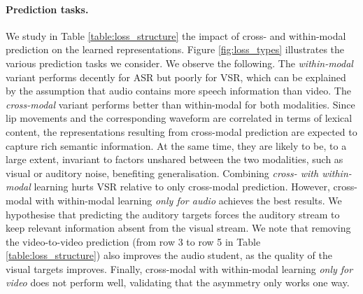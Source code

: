 \documentclass{article} \usepackage{iclr2023_conference,times}
\begin{document}
\paragraph{Prediction tasks.} We study in Table \ref{table:loss_structure} the impact of cross- and within-modal prediction on the learned representations. Figure \ref{fig:loss_types} illustrates the various prediction tasks we consider. We observe the following. The \textit{within-modal} variant performs decently for ASR but poorly for VSR, which can be explained by the assumption that audio contains more speech information than video. The \textit{cross-modal} variant performs better than within-modal for both modalities. Since lip movements and the corresponding waveform are correlated in terms of lexical content, the representations resulting from cross-modal prediction are expected to capture rich semantic information. At the same time, they are likely to be, to a large extent, invariant to factors unshared between the two modalities, such as visual or auditory noise, benefiting generalisation. Combining \textit{cross- with within-modal} learning hurts VSR relative to only cross-modal prediction. However, cross-modal with within-modal learning \textit{only for audio} achieves the best results. We hypothesise that predicting the auditory targets forces the auditory stream to keep relevant information absent from the visual stream. We note that removing the video-to-video prediction (from row 3 to row 5 in Table \ref{table:loss_structure}) also improves the audio student, as the quality of the visual targets improves. Finally, cross-modal with within-modal learning \textit{only for video} does not perform well, validating that the asymmetry only works one way.
\end{document}
